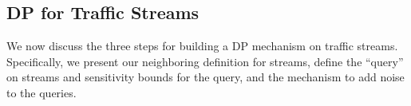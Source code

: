 %

\subsection{DP for Traffic Streams}
\label{subsec:building-blocks}

We now discuss the three steps for building a DP mechanism on
traffic streams. Specifically, we present our neighboring definition for
streams, define the ``query'' on streams and sensitivity bounds for the query,
and the mechanism to add noise to the queries.



